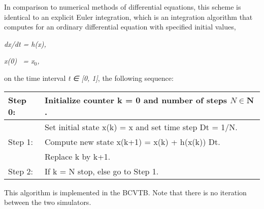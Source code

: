 In comparison to numerical methods of differential equations, this scheme is identical to an explicit Euler integration, which is an integration algorithm that computes for an ordinary differential equation with specified initial values,

\emph{dx/dt = h(x),}

\emph{x(0)~ = x\(_{0}\),}

on the time interval \emph{t} \emph{∈ {[}0, 1{]}}, the following sequence:

\begin{longtable}[c]{p{1.5in}p{4.5in}}
\toprule 
Step 0: & Initialize counter k = 0 and number of steps $N \in \mathbf{N}$ . \tabularnewline \midrule
\endhead
~ & Set initial state x(k) = x   and set time step Dt = 1/N. \tabularnewline
Step 1: & Compute new state x(k+1) = x(k) + h(x(k)) Dt. \tabularnewline
~ & Replace k by k+1. \tabularnewline
Step 2: & If k = N stop, else go to Step 1. \tabularnewline
\bottomrule
\end{longtable}

This algorithm is implemented in the BCVTB. Note that there is no iteration between the two simulators.
